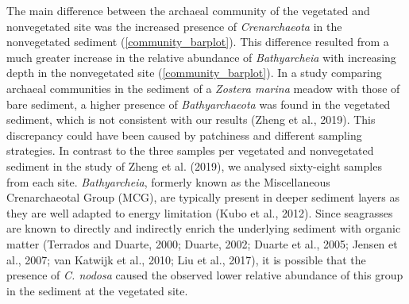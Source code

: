 \documentclass[12pt,]{article}
\begin{document}
The main difference between the archaeal community of the vegetated and
nonvegetated site was the increased presence of \emph{Crenarchaeota} in
the nonvegetated sediment (\autoref {community_barplot}). This
difference resulted from a much greater increase in the relative
abundance of \emph{Bathyarcheia} with increasing depth in the
nonvegetated site (\autoref {community_barplot}). In a study comparing
archaeal communities in the sediment of a \emph{Zostera marina} meadow
with those of bare sediment, a higher presence of \emph{Bathyarchaeota}
was found in the vegetated sediment, which is not consistent with our
results (Zheng et al., 2019). This discrepancy could have been caused by
patchiness and different sampling strategies. In contrast to the three
samples per vegetated and nonvegetated sediment in the study of Zheng et
al. (2019), we analysed sixty-eight samples from each site.
\emph{Bathyarcheia}, formerly known as the Miscellaneous Crenarchaeotal
Group (MCG), are typically present in deeper sediment layers as they are
well adapted to energy limitation (Kubo et al., 2012). Since seagrasses
are known to directly and indirectly enrich the underlying sediment with
organic matter (Terrados and Duarte, 2000; Duarte, 2002; Duarte et al.,
2005; Jensen et al., 2007; van Katwijk et al., 2010; Liu et al., 2017),
it is possible that the presence of \emph{C. nodosa} caused the observed
lower relative abundance of this group in the sediment at the vegetated
site.
\end{document}
